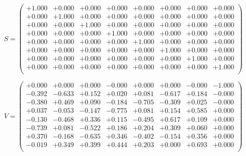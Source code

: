 \documentclass[9pt]{article}
\theoremstyle{plain}
\theoremstyle{definition}
\theoremstyle{remark}
\numberwithin{equation}{section}
\begin{document}
$S = \left(
\begin{array}{
cccccccc}
+1.000 & +0.000 & +0.000 & +0.000 & +0.000 & +0.000 & +0.000 & +0.000 \\
+0.000 & +1.000 & +0.000 & +0.000 & +0.000 & +0.000 & +0.000 & +0.000 \\
+0.000 & +0.000 & +1.000 & +0.000 & +0.000 & +0.000 & +0.000 & +0.000 \\
+0.000 & +0.000 & +0.000 & +1.000 & +0.000 & +0.000 & +0.000 & +0.000 \\
+0.000 & +0.000 & +0.000 & +0.000 & +1.000 & +0.000 & +0.000 & +0.000 \\
+0.000 & +0.000 & +0.000 & +0.000 & +0.000 & +1.000 & +0.000 & +0.000 \\
+0.000 & +0.000 & +0.000 & +0.000 & +0.000 & +0.000 & +1.000 & +0.000 \\
+0.000 & +0.000 & +0.000 & +0.000 & +0.000 & +0.000 & +0.000 & +1.000 \\
\end{array}
\right)$ \newline 

$V = \left(
\begin{array}{
cccccccc}
+0.000 & +0.000 & +0.000 & -0.000 & +0.000 & +0.000 & -0.000 & -1.000 \\
-0.392 & -0.633 & +0.152 & +0.020 & +0.081 & -0.617 & +0.184 & -0.000 \\
-0.380 & +0.469 & +0.090 & -0.184 & -0.705 & -0.309 & +0.025 & -0.000 \\
+0.037 & -0.053 & -0.147 & -0.775 & +0.081 & +0.154 & +0.585 & +0.000 \\
-0.130 & -0.468 & +0.336 & +0.115 & -0.495 & +0.617 & +0.109 & +0.000 \\
-0.739 & +0.081 & -0.522 & +0.186 & +0.204 & +0.309 & +0.060 & +0.000 \\
+0.370 & -0.168 & -0.635 & +0.346 & -0.402 & -0.154 & +0.356 & +0.000 \\
-0.019 & +0.349 & +0.399 & +0.444 & +0.203 & +0.000 & +0.693 & +0.000 \\
\end{array}
\right)$ \newline 
\end{document}
